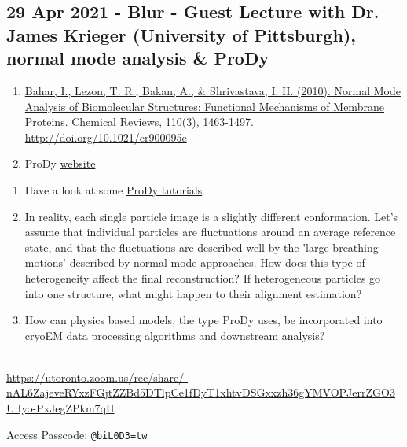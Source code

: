 \documentclass[11pt, oneside]{article}   	%
\begin{document}
\subsection{29 Apr 2021 - Blur - Guest Lecture with Dr. James Krieger (University of Pittsburgh), normal mode analysis \& ProDy}
\begin{enumerate}
	\item \href{https://www.ncbi.nlm.nih.gov/pmc/articles/PMC2836427/}{Bahar, I., Lezon, T. R., Bakan, A., \& Shrivastava, I. H. (2010). Normal Mode Analysis of Biomolecular Structures: Functional Mechanisms of Membrane Proteins. Chemical Reviews, 110(3), 1463-1497. http://doi.org/10.1021/cr900095e}
	\item ProDy \href{http://prody.csb.pitt.edu/}{website}
\end{enumerate}
\begin{enumerate}
	\item Have a look at some \href{http://prody.csb.pitt.edu/tutorials/}{ProDy tutorials}
	\item In reality, each single particle image is a slightly different conformation. Let's assume that individual particles are fluctuations around an average reference state, and that the fluctuations are described well by the 'large breathing motions' described by normal mode approaches. How does this type of heterogeneity affect the final reconstruction? If heterogeneous particles go into one structure, what might happen to their alignment estimation?
	\item How can physics based models, the type ProDy uses, be incorporated into cryoEM data processing algorithms and downstream analysis?
\end{enumerate}

 \\
{\tiny \url{https://utoronto.zoom.us/rec/share/-nAL6ZajeveRYxzFGjtZZBd5DTlpCe1fDyT1xhtvDSGxxzh36gYMVOPJerrZGO3U.Iyo-PxJegZPkm7qH}}

Access Passcode: \texttt{@biL0D3=tw}
\end{document}
